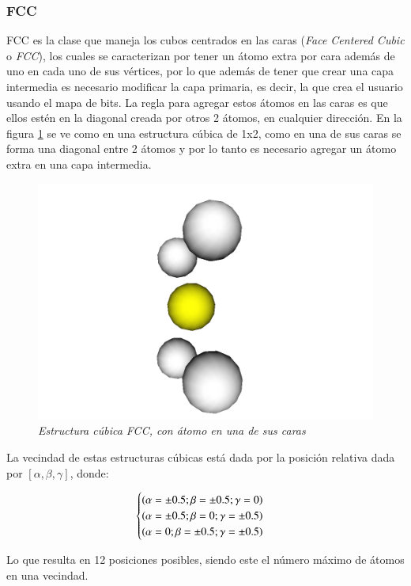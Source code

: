 \subsubsection{FCC}
FCC es la clase que maneja los cubos centrados en las caras (\emph{Face Centered Cubic} o \emph{FCC}), los cuales se caracterizan por tener un átomo extra por cara además de uno en cada uno de sus vértices, por lo que además de tener que crear una capa intermedia es necesario modificar la capa primaria, es decir, la que crea el usuario usando el mapa de bits. La regla para agregar estos átomos en las caras es que ellos estén en la diagonal creada por otros 2 átomos, en cualquier dirección. En la figura \ref{FCC-diagonal} se ve como en una estructura cúbica de 1x2, como en una de sus caras se forma una diagonal entre 2 átomos y por lo tanto es necesario agregar un átomo extra en una capa intermedia.

\begin{figure}[ht]
  \centering
  \includegraphics[scale=.3]{images/FCC-diagonal}
  \caption{\em Estructura cúbica FCC, con átomo en una de sus caras}
  \label{FCC-diagonal}
\end{figure}

La vecindad de estas estructuras cúbicas está dada por la posición relativa dada por $[\alpha, \beta, \gamma]$, donde:

\[
	\begin{cases}
		$$(\alpha = \pm 0.5; \beta = \pm 0.5; \gamma = 0)$$ \\
		$$(\alpha = \pm 0.5; \beta = 0; \gamma = \pm 0.5)$$ \\
		$$(\alpha = 0; \beta = \pm 0.5; \gamma = \pm 0.5)$$
	\end{cases}
\]


Lo que resulta en 12 posiciones posibles, siendo este el número máximo de átomos en una vecindad.